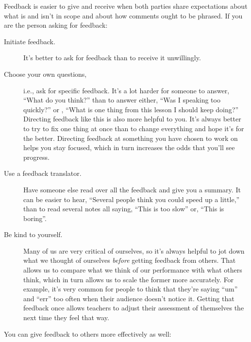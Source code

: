 Feedback is easier to give and receive when both parties share expectations
about what is and isn't in scope
and about how comments ought to be phrased.
If you are the person asking for feedback:

\begin{description}

\item[Initiate feedback.]
  It's better to ask for feedback than to receive it unwillingly.

\item[Choose your own questions,]
  i.e., ask for specific feedback.
  It's a lot harder for someone to answer,
  ``What do you think?''
  than to answer either,
  ``Was I speaking too quickly?''
  or ,
  ``What is one thing from this lesson I should keep doing?''
  Directing feedback like this is also more helpful to you.
  It's always better to try to fix one thing at once
  than to change everything and hope it's for the better.
  Directing feedback at something you have chosen to work on helps you stay focused,
  which in turn increases the odds that you'll see progress.

\item[Use a feedback translator.]
  Have someone else read over all the feedback and give you a summary.
  It can be easier to hear,
  ``Several people think you could speed up a little,''
  than to read several notes all saying, ``This is too slow''
  or, ``This is boring''.

\item[Be kind to yourself.]
  Many of us are very critical of ourselves,
  so it's always helpful to jot down what we thought of ourselves
  \emph{before} getting feedback from others.
  That allows us to compare what we think of our performance
  with what others think,
  which in turn allows us to scale the former more accurately.
  For example,
  it's very common for people to think that they're saying ``um'' and ``err'' too often
  when their audience doesn't notice it.
  Getting that feedback once allows teachers to adjust their assessment of themselves
  the next time they feel that way.

\end{description}

\noindent
You can give feedback to others more effectively as well:

